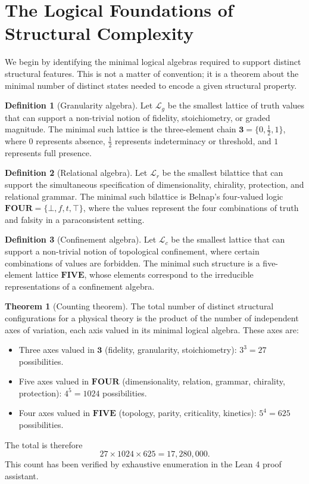 \documentclass[11pt,a4paper]{article}
\theoremstyle{definition}
\newtheorem{definition}{Definition}[section]
\newtheorem{theorem}{Theorem}[section]
\begin{document}
\section{The Logical Foundations of Structural Complexity}

We begin by identifying the minimal logical algebras required to support distinct structural features. This is not a matter of convention; it is a theorem about the minimal number of distinct states needed to encode a given structural property.

\begin{definition}[Granularity algebra]
Let \(\mathcal{L}_g\) be the smallest lattice of truth values that can support a non-trivial notion of fidelity, stoichiometry, or graded magnitude. The minimal such lattice is the three-element chain \(\mathbf{3} = \{0, \frac12, 1\}\), where \(0\) represents absence, \(\frac12\) represents indeterminacy or threshold, and \(1\) represents full presence.
\end{definition}

\begin{definition}[Relational algebra]
Let \(\mathcal{L}_r\) be the smallest bilattice that can support the simultaneous specification of dimensionality, chirality, protection, and relational grammar. The minimal such bilattice is Belnap's four-valued logic \(\mathbf{FOUR} = \{\bot, f, t, \top\}\), where the values represent the four combinations of truth and falsity in a paraconsistent setting.
\end{definition}

\begin{definition}[Confinement algebra]
Let \(\mathcal{L}_c\) be the smallest lattice that can support a non-trivial notion of topological confinement, where certain combinations of values are forbidden. The minimal such structure is a five-element lattice \(\mathbf{FIVE}\), whose elements correspond to the irreducible representations of a confinement algebra.
\end{definition}

\begin{theorem}[Counting theorem]
The total number of distinct structural configurations for a physical theory is the product of the number of independent axes of variation, each axis valued in its minimal logical algebra. These axes are:
\begin{itemize}
    \item Three axes valued in \(\mathbf{3}\) (fidelity, granularity, stoichiometry): \(3^3 = 27\) possibilities.
    \item Five axes valued in \(\mathbf{FOUR}\) (dimensionality, relation, grammar, chirality, protection): \(4^5 = 1024\) possibilities.
    \item Four axes valued in \(\mathbf{FIVE}\) (topology, parity, criticality, kinetics): \(5^4 = 625\) possibilities.
\end{itemize}
The total is therefore
\[
27 \times 1024 \times 625 = 17,280,000.
\]
This count has been verified by exhaustive enumeration in the Lean 4 proof assistant.
\end{theorem}
\end{document}

